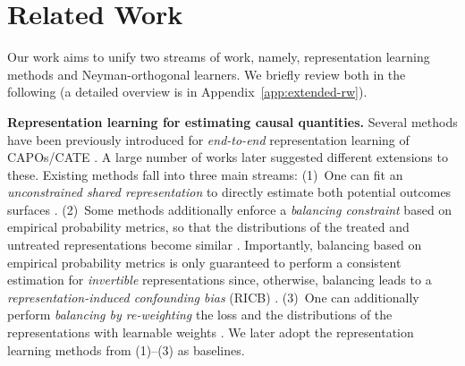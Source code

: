 \section{Related Work}
\label{sec:related-work}

Our work aims to unify two streams of work, namely, representation learning methods and Neyman-orthogonal learners. We briefly review both in the following (a detailed overview is in Appendix~\ref{app:extended-rw}).


\textbf{Representation learning for estimating causal quantities.} Several methods have been previously introduced for \emph{end-to-end} representation learning of CAPOs/CATE  \citep[see, in particular, the seminal works by][]{johansson2016learning,shalit2017estimating,johansson2022generalization}. A large number of works later suggested different extensions to these.
Existing methods fall into three main streams: (1)~One can fit an \emph{unconstrained shared representation} to directly estimate both potential outcomes surfaces \citep[e.g., \textbf{TARNet};][]{shalit2017estimating}. (2)~Some methods additionally enforce a \emph{balancing constraint} based on empirical probability metrics, so that the distributions of the treated and untreated representations become similar \citep[e.g., \textbf{CFR} and \textbf{BNN};][]{johansson2016learning,shalit2017estimating}. Importantly, balancing based on empirical probability metrics is only guaranteed to perform a consistent estimation for \emph{invertible} representations since, otherwise, balancing leads to a \emph{representation-induced confounding bias} (RICB) \citep{johansson2019support,melnychuk2024bounds}. (3)~One can additionally perform \emph{balancing by re-weighting} the loss and the distributions of the representations with learnable weights \citep[e.g., \textbf{RCFR};][]{johansson2022generalization}. We later adopt the representation learning methods from (1)--(3) as baselines. 


